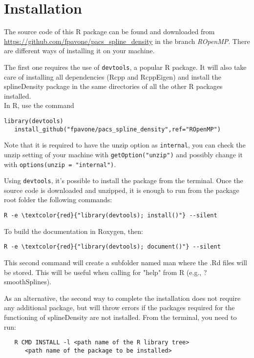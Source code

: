 \chapter{Installation}
\label{installation}

\noindent 
The source code of this R package can be found and downloaded from \url{https://github.com/fpavone/pacs_spline_density} in the branch \textit{ROpenMP}. 
There are different ways of installing it on your machine.

The first one requires the use of \verb|devtools|, a popular R package. It will also take care of installing all dependencies (Rcpp and RcppEigen) and install the splineDensity package in the same directories of all the other R packages installed.  \\
In R, use the command 
\begin{Verbatim}[commandchars=\\\{\}]
   library(devtools)
   install_github("fpavone/pacs_spline_density",ref="ROpenMP")
\end{Verbatim}
Note that it is required to have the unzip option as \verb|internal|, you can check the unzip setting of your machine with \verb|getOption("unzip")| and possibly change it with \verb|options(unzip = "internal")|.

Using \verb|devtools|, it's possible to install the package from the terminal.
Once the source code is downloaded and unzipped, it is enough to run from the package root folder the following commands:
\begin{Verbatim}[commandchars=\\\{\}]
   R -e \textcolor{red}{"library(devtools); install()"} --silent
\end{Verbatim}
To build the documentation in Roxygen, then:
\begin{Verbatim}[commandchars=\\\{\}]
   R -e \textcolor{red}{"library(devtools); document()"} --silent
\end{Verbatim}

This second command will create a subfolder named man where the .Rd files will be stored. This will be useful when calling for "help" from R (e.g., ?smoothSplines).

As an alternative, the second way to complete the installation does not require any additional package, but will throw errors if the packages required for the functioning of splineDensity are not installed.
From the terminal, you need to run:
\begin{verbatim}
   R CMD INSTALL -l <path name of the R library tree> 
      <path name of the package to be installed>
\end{verbatim}

